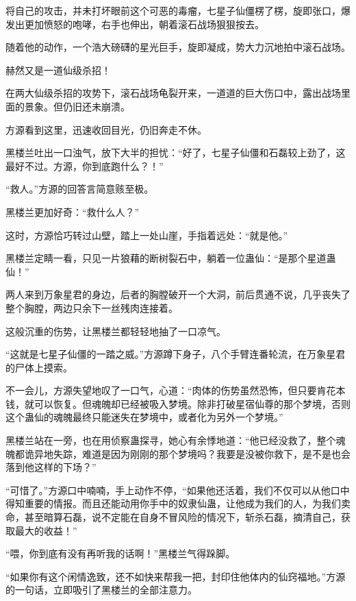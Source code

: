 
\begin{this_body}

将自己的攻击，并未打坏眼前这个可恶的毒瘤，七星子仙僵楞了楞，旋即张口，爆发出更加愤怒的咆哮，右手也伸出，朝着滚石战场狠狠按去。

随着他的动作，一个浩大磅礴的星光巨手，旋即凝成，势大力沉地拍中滚石战场。

赫然又是一道仙级杀招！

在两大仙级杀招的攻势下，滚石战场龟裂开来，一道道的巨大伤口中，露出战场里面的景象。但仍旧还未崩溃。

方源看到这里，迅速收回目光，仍旧奔走不休。

黑楼兰吐出一口浊气，放下大半的担忧：“好了，七星子仙僵和石磊较上劲了，这最好不过。方源，你到底跑什么？！”

“救人。”方源的回答言简意赅至极。

黑楼兰更加好奇：“救什么人？”

这时，方源恰巧转过山壁，踏上一处山崖，手指着远处：“就是他。”

黑楼兰定睛一看，只见一片狼藉的断树裂石中，躺着一位蛊仙：“是那个星道蛊仙！”

两人来到万象星君的身边，后者的胸膛破开一个大洞，前后贯通不说，几乎丧失了整个胸膛，两边只余下一丝残肉连接着。

这般沉重的伤势，让黑楼兰都轻轻地抽了一口凉气。

“这就是七星子仙僵的一踏之威。”方源蹲下身子，八个手臂连番轮流，在万象星君的尸体上摸索。

不一会儿，方源失望地叹了一口气，心道：“肉体的伤势虽然恐怖，但只要肯花本钱，就可以恢复。但魂魄却已经被吸入梦境。除非打破星宿仙尊的那个梦境，否则这个蛊仙的魂魄最终只能迷失在梦境中，或者化为另外一个梦境。”

黑楼兰站在一旁，也在用侦察蛊探寻，她心有余悸地道：“他已经没救了，整个魂魄都诡异地失踪，难道是因为刚刚的那个梦境吗？我要是没被你救下，是不是也会落到他这样的下场？”

“可惜了。”方源口中喃喃，手上动作不停，“如果他还活着，我们不仅可以从他口中得知重要的情报。而且还能动用你手中的奴隶仙蛊，让他成为我们的人，为我们卖命，甚至暗算石磊，说不定能在自身不冒风险的情况下，斩杀石磊，摘清自己，获取最大的收益！”

“喂，你到底有没有再听我的话啊！”黑楼兰气得跺脚。

“如果你有这个闲情逸致，还不如快来帮我一把，封印住他体内的仙窍福地。”方源的一句话，立即吸引了黑楼兰的全部注意力。


\end{this_body}
